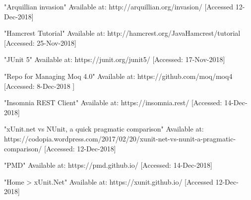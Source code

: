  "Arquillian invasion" Available at: http://arquillian.org/invasion/ [Accessed 12-Dec-2018]

 "Hamcrest Tutorial"
Available at: http://hamcrest.org/JavaHamcrest/tutorial [Accessed: 25-Nov-2018]

 "JUnit 5"
Available at: https://junit.org/junit5/ [Accessed: 17-Nov-2018]

 "Repo for Managing Moq 4.0"
Available at: https://github.com/moq/moq4 [Accessed: 8-Dec-2018 ]

 "Insomnia REST Client" Available at: https://insomnia.rest/ [Accessed: 14-Dec-2018]

 "xUnit.net vs NUnit, a quick pragmatic comparison" Available at: https://codopia.wordpress.com/2017/02/20/xunit-net-vs-nunit-a-pragmatic-comparison/ [Accessed: 12-Dec-2018]

 "PMD" Available at: https://pmd.github.io/ [Accessed: 14-Dec-2018]

 "Home > xUnit.Net"
Available at: https://xunit.github.io/ [Accessed 12-Dec-2018]
